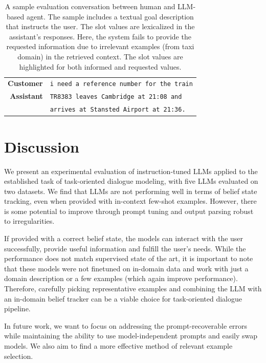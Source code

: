 \begin{table}[]
\begin{tabular}{r|l}
         \textbf{Customer} & \texttt{i need a {\color{orange!50!yellow!90!black!100!}reference number} for the train} \\
         \textbf{Assistant} & \texttt{{\color{red!100!yellow!90!black!100!}TR8383 leaves Cambridge at 21:08 and}} \\
         & \texttt{{\color{red!100!yellow!90!black!100!}arrives at Stansted Airport at 21:36}.}\\
         \bottomrule
    \end{tabular}
    \caption{A sample evaluation conversation between human and LLM-based agent. The sample includes a textual goal description that instructs the user. The slot values are lexicalized in the assistant's responses. Here, the system {\color{red!100!yellow!90!black!100!} fails} to provide the requested information due to irrelevant examples (from taxi domain) in the retrieved context. The slot values are highlighted for both {\color{cyan!80!yellow!80!black!100 }informed} and {\color{orange!50!yellow!90!black!100!}requested} values.}
    \label{07:tab:human-2}
\end{table}
\section{Discussion}

We present an experimental evaluation of instruction-tuned LLMs applied to the established task of task-oriented dialogue modeling, with five LLMs evaluated on two datasets.
We find that LLMs are not performing well in terms of belief state tracking, even when provided with in-context few-shot examples.
However, there is some potential to improve through prompt tuning and output parsing robust to irregularities.

If provided with a correct belief state, the models can interact with the user successfully, provide useful information and fulfill the user's needs.
While the performance does not match supervised state of the art, it is important to note that these models were not finetuned on in-domain data and work with just a domain description or a few examples (which again improve performance). 
Therefore, carefully picking representative examples and combining the LLM with an in-domain belief tracker can be a viable choice for task-oriented dialogue pipeline.

In future work, we want to focus on addressing the prompt-recoverable errors while maintaining the ability to use model-independent prompts and easily swap models. %
We also aim to find a more effective method of relevant example selection.

